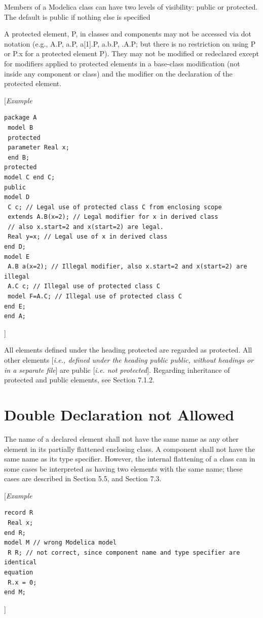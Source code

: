 \documentclass[10pt,a4paper]{report}
\def\Mcomment#1{{[}\emph{#1}{]}}
\def\Mcommentbegin#1{{[}\emph{#1}}
\def\Mcommentend#1{\emph{#1}{]}}
\def\doublelabel#1{\label{#1}\hypertarget{#1}{}}
\begin{document}
Members of a Modelica class can have two levels of visibility: public or
protected. The default is public if nothing else is specified

A protected element, P, in classes and components may not be accessed
via dot notation (e.g., A.P, a.P, a{[}1{]}.P, a.b.P, .A.P; but there is
no restriction on using P or P.x for a protected element P). They may
not be modified or redeclared except for modifiers applied to protected
elements in a base-class modification (not inside any component or
class) and the modifier on the declaration of the protected element.

\Mcommentbegin{Example}
\begin{lstlisting}[language=modelica]
package A
 model B
 protected
 parameter Real x;
 end B;
protected
model C end C;
public
model D
 C c; // Legal use of protected class C from enclosing scope
 extends A.B(x=2); // Legal modifier for x in derived class
 // also x.start=2 and x(start=2) are legal.
 Real y=x; // Legal use of x in derived class
end D;
model E
 A.B a(x=2); // Illegal modifier, also x.start=2 and x(start=2) are illegal
 A.C c; // Illegal use of protected class C
 model F=A.C; // Illegal use of protected class C
end E;
end A;
\end{lstlisting}
\Mcommentend{}

All elements defined under the heading protected are regarded as
protected. All other elements \Mcomment{i.e., defined under the heading \emph{public} 
public, without headings or in a separate file} are public
\Mcomment{i.e. not protected}. Regarding inheritance of protected and
public elements, see Section 7.1.2.

\section{Double Declaration not Allowed}\doublelabel{double-declaration-not-allowed}

The name of a declared element shall not have the same name as any other
element in its partially flattened enclosing class. A component shall
not have the same name as its type specifier. However, the internal
flattening of a class can in some cases be interpreted as having two
elements with the same name; these cases are described in Section 5.5,
and Section 7.3.

\Mcommentbegin{Example}
\begin{lstlisting}[language=modelica]
record R
 Real x;
end R;
model M // wrong Modelica model
 R R; // not correct, since component name and type specifier are identical
equation
 R.x = 0;
end M; 
\end{lstlisting}
\Mcommentend{}
\end{document}
